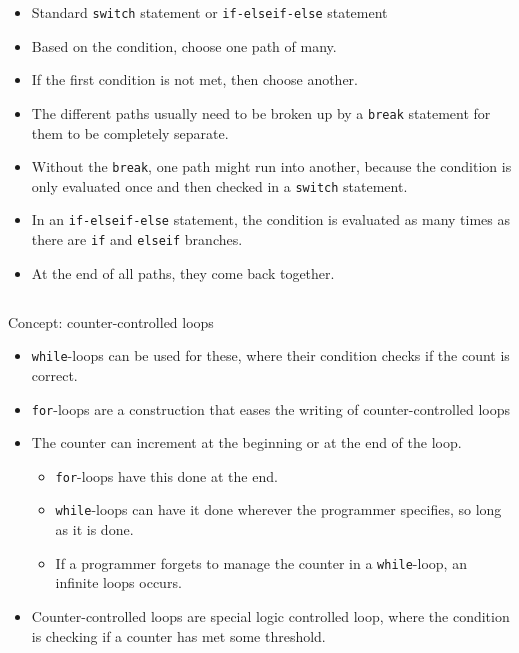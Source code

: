 \begin{itemize}[noitemsep]
\item Standard \texttt{switch} statement or \texttt{if-elseif-else} statement
\item Based on the condition, choose one path of many.
\item If the first condition is not met, then choose another.
\item The different paths usually need to be broken up by a \texttt{break} statement for them to be completely separate.
\item Without the \texttt{break}, one path might run into another, because the condition is only evaluated once and then checked in a \texttt{switch} statement.
\item In an \texttt{if-elseif-else} statement, the condition is evaluated as many times as there are \texttt{if} and \texttt{elseif} branches.
\item At the end of all paths, they come back together.
\end{itemize}

\subsection{}
Concept: counter-controlled loops

\begin{itemize}[noitemsep]
\item \texttt{while}-loops can be used for these, where their condition checks if the count is correct.
\item \texttt{for}-loops are a construction that eases the writing of counter-controlled loops
\item The counter can increment at the beginning or at the end of the loop.
  \begin{itemize}[noitemsep]
  \item \texttt{for}-loops have this done at the end.
  \item \texttt{while}-loops can have it done wherever the programmer specifies, so long as it is done.
  \item If a programmer forgets to manage the counter in a \texttt{while}-loop, an infinite loops occurs.
  \end{itemize}
\item Counter-controlled loops are special logic controlled loop, where the condition is checking if a counter has met some threshold.
\end{itemize}

